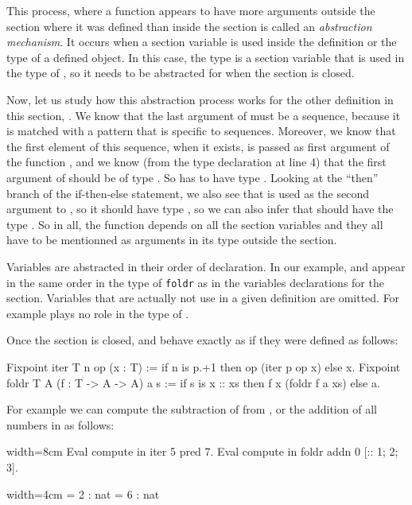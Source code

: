 This process, where a function appears to have more arguments outside
the section where it was defined than inside the section is called
an {\em abstraction mechanism}.
It occurs when a section variable is used inside the definition or
the type of a defined object.  In this case, the type  is a section
variable that is used in the type of , so it needs to be
abstracted for  when the section is closed.

Now, let us study how this abstraction process works for the other definition
in this section, .  We know that the last argument  of 
must be a sequence, because it is matched with a pattern that is specific
to sequences.  Moreover, we know that the first element of this sequence,
when it exists, is passed as first argument of the function , and
we know (from the type declaration at line 4) that the first argument of
 should be of type .  So  has to have type .
Looking at the ``then'' branch of the if-then-else statement, we also see
that  is used as the second argument to , so it should
have type , so we can also infer that  should have the type .
So in all, the function  depends on all the section variables and
they all have to be mentionned as arguments in its type outside the section.

Variables are abstracted in their order of declaration.  In our example,
 and  appear in the same order in the type of {\tt foldr} as
in the variables declarations for the section.  Variables that are actually
not use in a given definition are omitted. For example  plays no
role in the type of .

Once the section is closed,  and  behave exactly as
if they were defined as follows:

\begin{coq}{}{}
Fixpoint iter T n op (x : T) :=
  if n is p.+1 then op (iter p op x) else x.
Fixpoint foldr T A (f : T -> A -> A) a s :=
  if s is x :: xs then f x (foldr f a xs) else a.
\end{coq}
For example we can compute the subtraction of  from , or the
addition of all numbers in \C{[:: 1; 2; 3]}
as follows:

\begin{coq}{}{width=8cm}
Eval compute in iter 5 pred 7.
Eval compute in foldr addn 0 [:: 1; 2; 3].
\end{coq}
\begin{coqout}{}{width=4cm}
 = 2 : nat
 = 6 : nat
\end{coqout}

